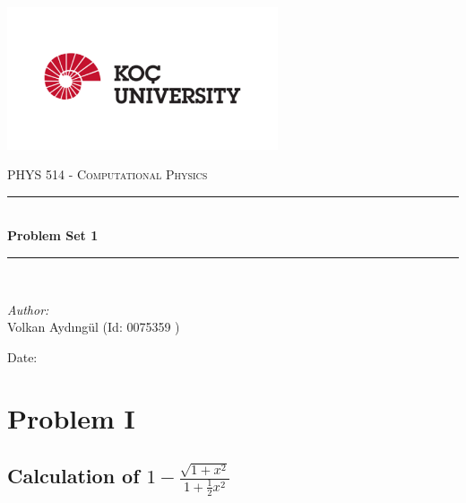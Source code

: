 \documentclass[letterpaper,12pt]{article}
\newcommand{\reporttitle}{Problem Set 1}
\newcommand{\reportauthor}{ Volkan Aydıngül (Id: 0075359 )\\
                            }
\begin{document}
\begin{titlepage}
\newcommand{\HRule}{\rule{\linewidth}{0.5mm}}
\begin{center} %
\includegraphics[width = 8cm]{figures/koc_logo.png}

\textsc{\Large PHYS 514 - Computational Physics}\\[1.5cm] 
\HRule \\[0.6cm]
{ \huge \bfseries \reporttitle}\\ %
\HRule \\[1.5cm]
\end{center}
\vspace{2cm}
\begin{flushleft} \large
\textit{Author:}\\
\reportauthor%
\end{flushleft}
\vspace{2cm}
\makeatletter
Date: \@date 
\vfill %
\makeatother
\end{titlepage}




\tableofcontents
\newpage






\section{Problem I}
\subsection{Calculation of $1 - \frac{\sqrt{1+x^2}}{1+\frac{1}{2}x^2}$}
\end{document}
